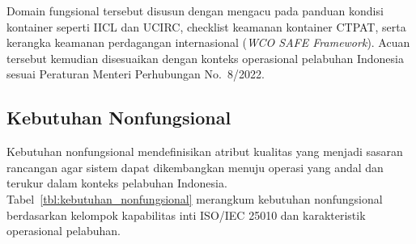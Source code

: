 \FloatBarrier

Domain fungsional tersebut disusun dengan mengacu pada panduan kondisi kontainer
seperti IICL dan UCIRC, checklist keamanan kontainer CTPAT, serta kerangka
keamanan perdagangan internasional (\textit{WCO SAFE Framework}). Acuan tersebut
kemudian disesuaikan dengan konteks operasional pelabuhan Indonesia sesuai
Peraturan Menteri Perhubungan No.~8/2022.

\subsection{Kebutuhan Nonfungsional}

Kebutuhan nonfungsional mendefinisikan atribut kualitas yang menjadi sasaran rancangan agar sistem dapat dikembangkan menuju operasi yang andal dan terukur dalam konteks pelabuhan Indonesia. Tabel~\ref{tbl:kebutuhan_nonfungsional} merangkum kebutuhan nonfungsional berdasarkan kelompok kapabilitas inti ISO/IEC 25010 dan karakteristik operasional pelabuhan.

